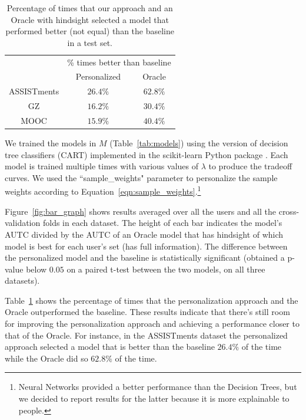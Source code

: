 \documentclass[letterpaper]{article} %
\theoremstyle{definition}
\begin{document}
\begin{table}[t]
\begin{center}
{
\setlength{\tabcolsep}{4pt}
\begin{tabular}{c|cc}
\hline
\rule{0pt}{12pt}
\multirow{2}{*}{Dataset}&\multicolumn{2}{c}{\% times better than baseline}\\
\rule{0pt}{12pt}
& Personalized& Oracle
\\\hline
\rule{0pt}{12pt}ASSISTments&$26.4\%$&$62.8\%$\\
\rule{0pt}{12pt}GZ&$16.2\%$&$30.4\%$\\
\rule{0pt}{12pt}MOOC&$15.9\%$&$40.4\%$\\
\hline
\end{tabular}
\caption{Percentage of times that our approach and an Oracle with hindsight selected a model that performed better (not equal) than the baseline in a test set.}
\label{tab:agent_results}}
\end{center}
\end{table}

We trained the models in $M$ (Table~\ref{tab:models}) using the version of decision tree classifiers (CART) implemented in the scikit-learn Python package \cite{scikit-learn}. Each model is trained multiple times with various values of $\lambda$ to produce the tradeoff curves.
We  used the ``sample\_weights" parameter to personalize the sample weights  according to Equation~\ref{eqn:sample_weights}.\footnote{Neural Networks provided a better performance than the Decision Trees, but we decided to report results for the latter because it is more explainable to people.}

Figure~\ref{fig:bar_graph} shows results averaged over all the users and all the cross-validation folds in each dataset. The height of each bar indicates the model's AUTC divided by the AUTC of an Oracle model that has hindsight of which model is best for each user's set (has full information).
The difference between the personalized model and the baseline is statistically significant (obtained a p-value below $0.05$ on a paired t-test between the two models, on all three datasets).

Table~\ref{tab:agent_results} shows the percentage of times that the personalization approach and the Oracle outperformed the baseline. These results indicate that there's still room for improving the personalization approach and achieving a performance closer to that of the Oracle. For instance, in the ASSISTments dataset the personalized approach selected a model that is better than the baseline $26.4\%$ of the time while the Oracle did so $62.8\%$ of the time.
\end{document}
